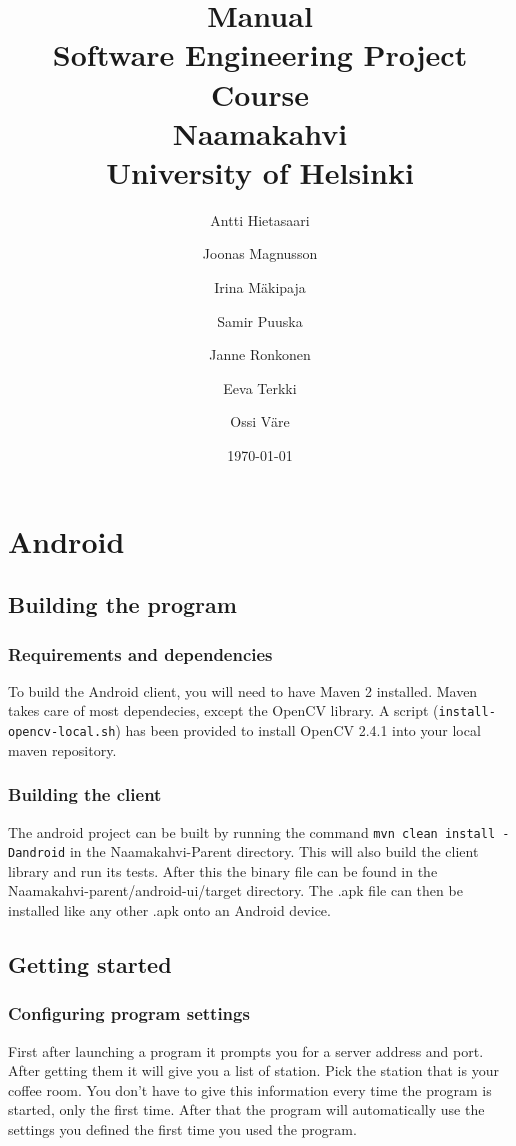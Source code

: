 \documentclass[11pt]{article}
\title{Manual\\
  Software Engineering Project Course\\
  Naamakahvi\\
  University of Helsinki}
\author{Antti Hietasaari
  \and Joonas Magnusson
  \and Irina Mäkipaja
  \and Samir Puuska
  \and Janne Ronkonen
  \and Eeva Terkki
  \and Ossi Väre}
\date{\today}
\begin{document}
\maketitle

\setcounter{tocdepth}{2}
\tableofcontents



\section{Android}
\subsection{Building the program}
\subsubsection*{Requirements and dependencies}
To build the Android client, you will need to have Maven 2 installed. Maven takes care of most dependecies, except the OpenCV library. A script (\texttt{install-opencv-local.sh}) has been provided to install OpenCV 2.4.1 into your local maven repository.
\subsubsection*{Building the client}
The android project can be built by running the command \texttt{mvn clean install -Dandroid} in the Naamakahvi-Parent directory. This will also build the client library and run its tests. After this the binary file  can be found in the Naamakahvi-parent/android-ui/target directory. The .apk file can then be installed like any other .apk onto an Android device.
\subsection{Getting started}
\subsubsection*{Configuring program settings}
First after launching a program it prompts you for a server address and port. After getting them it will give you a list of station. Pick the station that is your coffee room. You don’t have to give this information every time the program is started, only the first time. After that the program will automatically use the settings you defined the first time you used the program.
\end{document}
